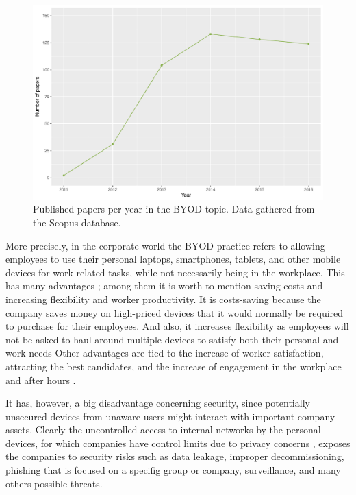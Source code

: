 \begin{figure}
	\centering
	\includegraphics[scale =0.5] {gfx/intro/BYODpapers_year.pdf}
	\caption{Published papers per year in the BYOD topic. Data gathered from the Scopus database.}
	\label{fig:pperyear}
\end{figure}

More precisely, in the corporate world the BYOD practice refers to allowing employees to use their personal laptops, smartphones, tablets, and other mobile devices for work-related tasks, while not necessarily being in the workplace. This has many advantages \cite{singh2012byod}; among them it is worth to mention saving costs and increasing flexibility and worker productivity. It is costs-saving because the company saves money on high-priced devices that it would normally be required to purchase for their employees. And also, it increases flexibility  as employees will not be asked to haul around multiple devices to satisfy both their personal and work needs Other advantages are tied to the increase of worker satisfaction, attracting the best candidates, and the increase of engagement in the workplace and after hours \cite{singh2012byod}.

It has, however, a big disadvantage concerning security, since potentially unsecured devices from unaware users might interact with important company assets. Clearly the uncontrolled access to internal networks by the personal devices, for which companies have control limits due to privacy concerns \cite{miller2012byod}, exposes the companies to security risks such as data leakage, improper decommissioning, phishing that is focused on a specifig group or company, surveillance, and many others possible threats\cite{lennon2012changing}.

